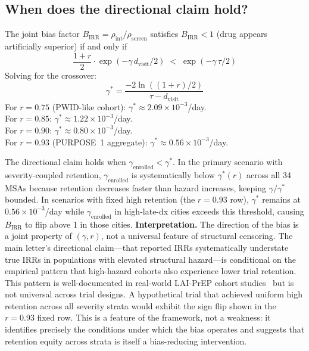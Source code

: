 \documentclass[11pt]{article}
\begin{document}
\subsection{When does the directional claim hold?}\label{sec:directional}

The joint bias factor $B_{\mathrm{IRR}} = \rho_{\mathrm{int}}/\rho_{\mathrm{screen}}$ satisfies $B_{\mathrm{IRR}} < 1$ (drug appears artificially superior) if and only if
\begin{equation}
\frac{1+r}{2} \cdot \exp(-\gamma\, d_{\mathrm{visit}}/2) \;<\; \exp(-\gamma\,\tau/2)
\end{equation}
Solving for the crossover:
\begin{equation}
\gamma^* = \frac{-2\ln((1+r)/2)}{\tau - d_{\mathrm{visit}}}
\end{equation}
For $r = 0.75$ (PWID-like cohort): $\gamma^* \approx 2.09 \times 10^{-3}$/day.\\
For $r = 0.85$: $\gamma^* \approx 1.22 \times 10^{-3}$/day.\\
For $r = 0.90$: $\gamma^* \approx 0.80 \times 10^{-3}$/day.\\
For $r = 0.93$ (PURPOSE~1 aggregate): $\gamma^* \approx 0.56 \times 10^{-3}$/day.

The directional claim holds when $\gamma_{\mathrm{enrolled}} < \gamma^*$. In the primary scenario with severity-coupled retention, $\gamma_{\mathrm{enrolled}}$ is systematically below $\gamma^*(r)$ across all 34 MSAs because retention decreases faster than hazard increases, keeping $\gamma/\gamma^*$ bounded. In scenarios with fixed high retention (the $r = 0.93$ row), $\gamma^*$ remains at $0.56 \times 10^{-3}$/day while $\gamma_{\mathrm{enrolled}}$ in high-late-dx cities exceeds this threshold, causing $B_{\mathrm{IRR}}$ to flip above 1 in those cities.
\textbf{Interpretation.} The direction of the bias is a joint property of $(\gamma, r)$, not a universal feature of structural censoring. The main letter's directional claim---that reported IRRs systematically understate true IRRs in populations with elevated structural hazard---is conditional on the empirical pattern that high-hazard cohorts also experience lower trial retention. This pattern is well-documented in real-world LAI-PrEP cohort studies~\cite{mills2025opera,psaros2024hptn083} but is not universal across trial designs. A hypothetical trial that achieved uniform high retention across all severity strata would exhibit the sign flip shown in the $r = 0.93$ fixed row. This is a feature of the framework, not a weakness: it identifies precisely the conditions under which the bias operates and suggests that retention equity across strata is itself a bias-reducing intervention.
\end{document}
